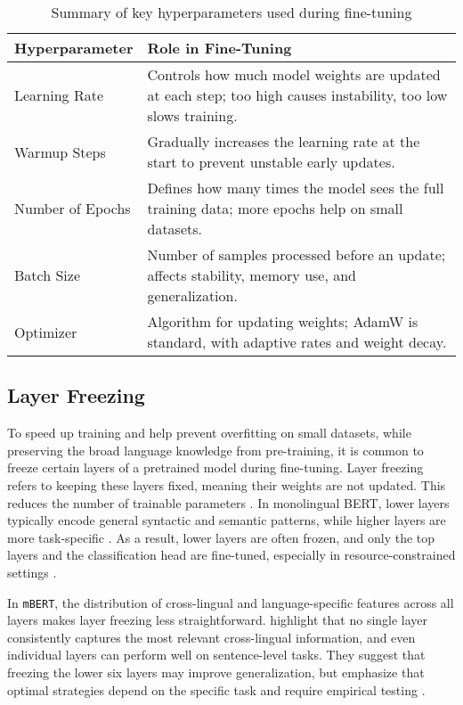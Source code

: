     \vspace{0.6em}
    \begin{table}[h]
        \centering
        \begin{tabularx}{\textwidth}{l X}
        \toprule
        \textbf{Hyperparameter} & \textbf{Role in Fine-Tuning} \\
        \midrule
        Learning Rate & Controls how much model weights are updated at each step; too high causes instability, too low slows training. \\
        Warmup Steps & Gradually increases the learning rate at the start to prevent unstable early updates. \\
        Number of Epochs & Defines how many times the model sees the full training data; more epochs help on small datasets. \\
        Batch Size & Number of samples processed before an update; affects stability, memory use, and generalization. \\
        Optimizer & Algorithm for updating weights; AdamW is standard, with adaptive rates and weight decay. \\
        \bottomrule
        \end{tabularx}
        \caption{Summary of key hyperparameters used during fine-tuning}
    \end{table}


\subsection{Layer Freezing} \label{subsection:layer_freezing}
    To speed up training and help prevent overfitting on small datasets, while preserving the broad language knowledge from pre-training, it is common to freeze certain layers of a pretrained model during fine-tuning. Layer freezing refers to keeping these layers fixed, meaning their weights are not updated. This reduces the number of trainable parameters \parencite{sorrentiSelectiveFreezingEfficient2023}. In monolingual BERT, lower layers typically encode general syntactic and semantic patterns, while higher layers are more task-specific \parencite{nadipalliLayerWiseEvolutionRepresentations2025}. As a result, lower layers are often frozen, and only the top layers and the classification head are fine-tuned, especially in resource-constrained settings \parencite{nadipalliLayerWiseEvolutionRepresentations2025}.


    In \texttt{mBERT}, the distribution of cross-lingual and language-specific features across all layers makes layer freezing less straightforward. \textcite{wuBetoBentzBecas2019} highlight that no single layer consistently captures the most relevant cross-lingual information, and even individual layers can perform well on sentence-level tasks. They suggest that freezing the lower six layers may improve generalization, but emphasize that optimal strategies depend on the specific task and require empirical testing \parencite{wuBetoBentzBecas2019}.

